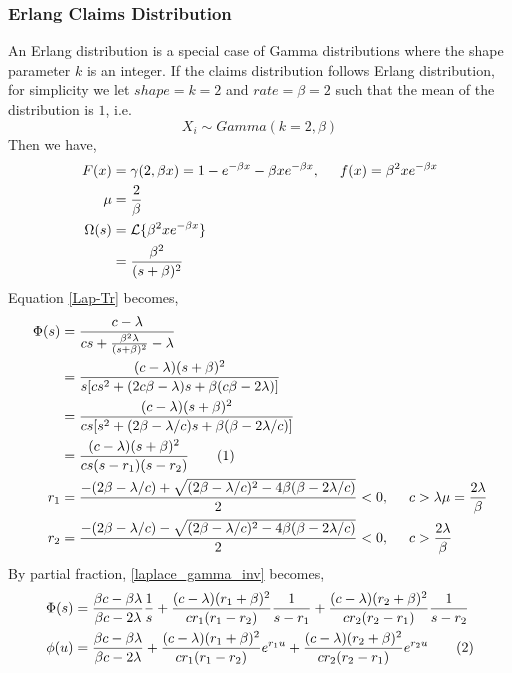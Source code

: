 \documentclass[12pt]{article}
\newcommand\numberthis{\addtocounter{equation}{1}\tag{\theequation}}
\begin{document}

\subsubsection{Erlang Claims Distribution}
    \hspace{5.3mm}An Erlang distribution is a special case of Gamma distributions where the shape parameter \(k\) is an integer. If the claims distribution follows Erlang distribution, for simplicity we let \(shape=k=2\) and \(rate=\beta=2\) such that the mean of the distribution is \(1\), i.e. 
    \[X_i\sim Gamma(k=2,\beta)\]
    Then we have,
    \begin{align*}
     F(x)&=\gamma(2,\beta x)=1-e^{-\beta x}-\beta xe^{-\beta x},
     \hspace{0.5cm}
     f(x)=\beta^2xe^{-\beta x}\\
     \mu&=\frac{2}{\beta}\\
     \Omega(s)&=\mathcal{L}\{\beta^2xe^{-\beta x}\}\\
     &=\frac{\beta^2}{(s+\beta)^2}
    \end{align*}
    Equation \eqref{Lap-Tr} becomes,
    \begin{align*}
        \Phi(s)&=\frac{c-\lambda}{cs+\frac{\beta^2\lambda}{(s+\beta)^2}-\lambda}\\
        &=\frac{(c-\lambda)(s+\beta)^2}{s[cs^2+(2c\beta-\lambda)s+\beta(c\beta-2\lambda)]}\\
        &=\frac{(c-\lambda)(s+\beta)^2}{cs[s^2+(2\beta-\lambda/c)s+\beta(\beta-2\lambda/c)]}\\
        &=\frac{(c-\lambda)(s+\beta)^2}{cs(s-r_1)(s-r_2)}\numberthis\label{laplace_gamma_inv}\\
        r_1&=\frac{-(2\beta-\lambda/c)+\sqrt{(2\beta-\lambda/c)^2-4\beta(\beta-2\lambda/c)}}{2}<0,
        \hspace{0.5cm}
        c>\lambda\mu=\frac{2\lambda}{\beta}\\
        r_2&=\frac{-(2\beta-\lambda/c)-\sqrt{(2\beta-\lambda/c)^2-4\beta(\beta-2\lambda/c)}}{2}<0,
        \hspace{0.5cm}
        c>\frac{2\lambda}{\beta}
    \end{align*}
    By partial fraction, \eqref{laplace_gamma_inv} becomes,
    \begin{align*}
        \Phi(s)&=\frac{\beta c-\beta\lambda}{\beta c-2\lambda}\frac{1}{s}+\frac{(c-\lambda)(r_1+\beta)^2}{cr_1(r_1-r_2)}\frac{1}{s-r_1}+\frac{(c-\lambda)(r_2+\beta)^2}{cr_2(r_2-r_1)}\frac{1}{s-r_2}\\
        \phi(u)&=\frac{\beta c-\beta\lambda}{\beta c-2\lambda}+\frac{(c-\lambda)(r_1+\beta)^2}{cr_1(r_1-r_2)}e^{r_1u}+\frac{(c-\lambda)(r_2+\beta)^2}{cr_2(r_2-r_1)}e^{r_2u}\numberthis\label{gamma_noinv_surv}
    \end{align*}
\end{document}
